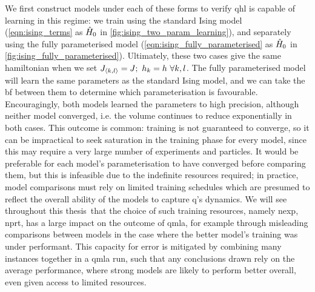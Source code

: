 We first construct models under each of these forms to verify \gls{qhl} is capable of learning in this regime:
    we train using the standard Ising model (\cref{eqn:ising_terms} as $\hat{H}_0$ in \cref{fig:ising_two_param_learning}),
    and separately using the fully parameterised model (\cref{eqn:ising_fully_parameterised} as $\hat{H}_0$ in \cref{fig:ising_fully_parameterised}).
Ultimately, these two cases give the same \gls{hamiltonian} when we set $J_{{ \langle k, l \rangle }} = J; \ h_k = h \ \forall k,l$.
The fully parameterised model will learn the same parameters as the standard Ising model,
    and we can take the \gls{bf} between them to determine which parameterisation is favourable.
Encouragingly, both models learned the parameters to high precision, although neither model converged,
    i.e. the \gls{volume} continues to reduce exponentially in both cases.
This outcome is common: training is not guaranteed to converge\footnotemark, 
    so it can be impractical to seek saturation in the training phase for every model, 
    since this may require a very large number of \glspl{experiment} and \glspl{particle}. 
It would be preferable for each model's parameterisation to have converged before comparing them, 
    but this is infeasible due to the indefinite resources required; 
    in practice, model comparisons must rely on limited training schedules which are presumed to reflect the overall ability of 
    the models to capture \gls{q}'s dynamics. 
We will see throughout this thesis\footnotemark \ that the choice of such training resources, namely \gls{nexp}, \gls{nprt}, 
    has a large impact on the outcome of \gls{qmla}, for example through misleading comparisons between models 
    in the case where the better model's training was under performant. 
This capacity for error is mitigated by combining many \glspl{instance} together in 
    a \gls{qmla} \gls{run}, such that any conclusions drawn rely on the average performance, 
    where strong models are likely to perform better overall, even given access to limited resources. 
\par 

